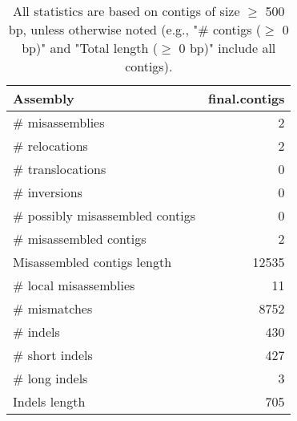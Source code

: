 \documentclass[12pt,a4paper]{article}
\begin{document}
\begin{table}[ht]
\begin{center}
\caption{All statistics are based on contigs of size $\geq$ 500 bp, unless otherwise noted (e.g., "\# contigs ($\geq$ 0 bp)" and "Total length ($\geq$ 0 bp)" include all contigs).}
\begin{tabular}{|l*{1}{|r}|}
\hline
Assembly & final.contigs \\ \hline
\# misassemblies & 2 \\ \hline
\hspace{5mm}\# relocations & 2 \\ \hline
\hspace{5mm}\# translocations & 0 \\ \hline
\hspace{5mm}\# inversions & 0 \\ \hline
\# possibly misassembled contigs & 0 \\ \hline
\# misassembled contigs & 2 \\ \hline
Misassembled contigs length & 12535 \\ \hline
\# local misassemblies & 11 \\ \hline
\# mismatches & 8752 \\ \hline
\# indels & 430 \\ \hline
\hspace{5mm}\# short indels & 427 \\ \hline
\hspace{5mm}\# long indels & 3 \\ \hline
Indels length & 705 \\ \hline
\end{tabular}
\end{center}
\end{table}
\end{document}
